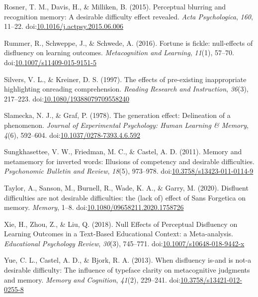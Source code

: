 \documentclass[jou]{apa6}
\begin{document}
\leavevmode\hypertarget{ref-Rosner2015}{}%
Rosner, T. M., Davis, H., \& Milliken, B. (2015). Perceptual blurring and recognition memory: A desirable difficulty effect revealed. \emph{Acta Psychologica}, \emph{160}, 11--22. doi:\href{https://doi.org/10.1016/j.actpsy.2015.06.006}{10.1016/j.actpsy.2015.06.006}

\leavevmode\hypertarget{ref-Rummer2016}{}%
Rummer, R., Schweppe, J., \& Schwede, A. (2016). Fortune is fickle: null-effects of disfluency on learning outcomes. \emph{Metacognition and Learning}, \emph{11}(1), 57--70. doi:\href{https://doi.org/10.1007/s11409-015-9151-5}{10.1007/s11409-015-9151-5}

\leavevmode\hypertarget{ref-Silvers1997}{}%
Silvers, V. L., \& Kreiner, D. S. (1997). The effects of pre-existing inappropriate highlighting onreading comprehension. \emph{Reading Research and Instruction}, \emph{36}(3), 217--223. doi:\href{https://doi.org/10.1080/19388079709558240}{10.1080/19388079709558240}

\leavevmode\hypertarget{ref-Slamecka1978}{}%
Slamecka, N. J., \& Graf, P. (1978). The generation effect: Delineation of a phenomenon. \emph{Journal of Experimental Psychology: Human Learning \& Memory}, \emph{4}(6), 592--604. doi:\href{https://doi.org/10.1037/0278-7393.4.6.592}{10.1037/0278-7393.4.6.592}

\leavevmode\hypertarget{ref-Sungkhasettee2011}{}%
Sungkhasettee, V. W., Friedman, M. C., \& Castel, A. D. (2011). Memory and metamemory for inverted words: Illusions of competency and desirable difficulties. \emph{Psychonomic Bulletin and Review}, \emph{18}(5), 973--978. doi:\href{https://doi.org/10.3758/s13423-011-0114-9}{10.3758/s13423-011-0114-9}

\leavevmode\hypertarget{ref-Taylor2020}{}%
Taylor, A., Sanson, M., Burnell, R., Wade, K. A., \& Garry, M. (2020). Disfluent difficulties are not desirable difficulties: the (lack of) effect of Sans Forgetica on memory. \emph{Memory}, 1--8. doi:\href{https://doi.org/10.1080/09658211.2020.1758726}{10.1080/09658211.2020.1758726}

\leavevmode\hypertarget{ref-Xie2018}{}%
Xie, H., Zhou, Z., \& Liu, Q. (2018). Null Effects of Perceptual Disfluency on Learning Outcomes in a Text-Based Educational Context: a Meta-analysis. \emph{Educational Psychology Review}, \emph{30}(3), 745--771. doi:\href{https://doi.org/10.1007/s10648-018-9442-x}{10.1007/s10648-018-9442-x}

\leavevmode\hypertarget{ref-Yue2013}{}%
Yue, C. L., Castel, A. D., \& Bjork, R. A. (2013). When disfluency is-and is not-a desirable difficulty: The influence of typeface clarity on metacognitive judgments and memory. \emph{Memory and Cognition}, \emph{41}(2), 229--241. doi:\href{https://doi.org/10.3758/s13421-012-0255-8}{10.3758/s13421-012-0255-8}

\endgroup
\end{document}
